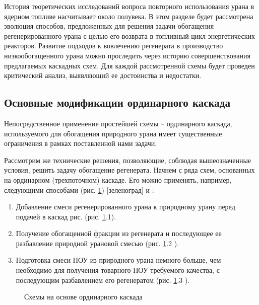 История теоретических исследований вопроса повторного использования урана в ядерном топливе насчитывает около полувека.
В этом разделе будет рассмотрена эволюция способов, предложенных для решения задачи обогащения регенерированного урана с целью его возврата в топливный цикл энергетических реакторов.
Развитие подходов к вовлечению регенерата в производство низкообогащенного урана можно проследить через историю совершенствования предлагаемых каскадных схем.
Для каждой рассмотренной схемы будет проведен критический анализ, выявляющий ее достоинства и недостатки.

\subsection{Основные модификации ординарного каскада}

Непосредственное применение простейшей схемы -- ординарного каскада, используемого для обогащения природного урана имеет существенные ограничения в рамках поставленной нами задачи.

Рассмотрим же технические решения, позволяющие, соблюдая вышеозначенные условия, решить задачу обогащение регенерата. Начнем с ряда схем, основанных на ординарном (трехпоточном) каскаде.
Его можно применять, например, следующими способами (рис. \ref{fig:diagram1}) [зеленоград] и \cite{smirnovKaskadnyeShemyZadachah2012}:
\begin{enumerate}
  \item Добавление смеси регенерированного урана к природному урану перед подачей в каскад рис. (рис. \ref{fig:diagram1}.1).
  \item Получение обогащенной фракции из регенерата и последующее ее разбавление природной урановой смесью (рис. \ref{fig:diagram1}.2 ).
  \item Подготовка смеси НОУ из природного урана немного больше, чем необходимо для получения товарного НОУ требуемого качества, с последующим разбавлением его регенератом (рис. \ref{fig:diagram1}.3 ).
\end{enumerate}

\begin{figure}[ht]
  \caption{Схемы на основе ординарного каскада}\label{fig:diagram1}
\end{figure}

